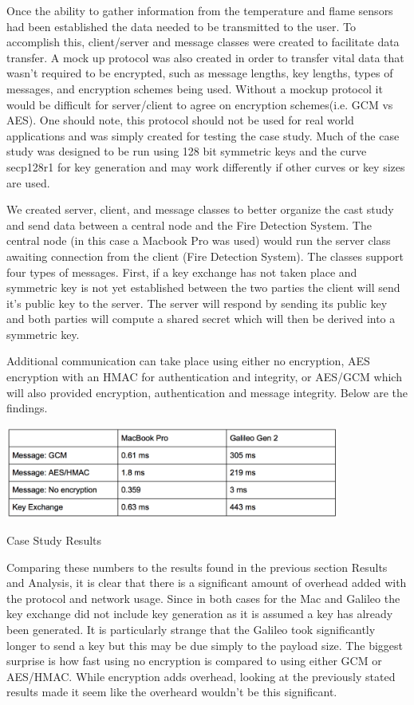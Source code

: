 Once the ability to gather information from the temperature and flame sensors had been established the data needed to be transmitted to the user. To accomplish this, client/server and message classes were created to facilitate data transfer. A mock up protocol was also created in order to transfer vital data that wasn't required to be encrypted, such as message lengths, key lengths, types of messages, and encryption schemes being used.  Without a mockup protocol it would be difficult for server/client to agree on encryption schemes(i.e. GCM vs AES). One should note, this protocol should not be used for real world applications and was simply created for testing the case study. Much of the case study was designed to be run using 128 bit symmetric keys and the curve secp128r1 for key generation and may work differently if other curves or key sizes are used.

We created server, client, and message classes to better organize the cast study and send data between a central node and the Fire Detection System. The central node (in this case a Macbook Pro was used)  would run the server class awaiting connection from the client (Fire Detection System). The classes support four types of messages. First, if a key exchange has not taken place and symmetric key is not yet established between the two parties the client will send it's public key to the server. The server will respond by sending its public key and both parties will compute a shared secret which will then be derived into a symmetric key. 

Additional communication can take place using either no encryption, AES encryption with an HMAC for authentication and integrity, or AES/GCM which will also provided encryption, authentication and message integrity. Below are the findings. 


 \begin{table}[t]
	\centering
	\includegraphics[width=11cm,height=0.7\textheight,keepaspectratio]{./figures/table_4}
	\center\caption[font=footnote]{Case Study Results}
\end{table}

Comparing these numbers to the results found in the previous section Results and Analysis, it is clear that there is a significant amount of overhead added with the protocol and network usage. Since in both cases for the Mac and Galileo the key exchange did not include key generation as it is assumed a key has already been generated. It is particularly strange that the Galileo took significantly longer to send a key but this may be due simply to the payload size. The biggest surprise is how fast using no encryption is compared to using either GCM or AES/HMAC. While encryption adds overhead, looking at the previously stated results made it seem like the overheard wouldn't be this significant. 

